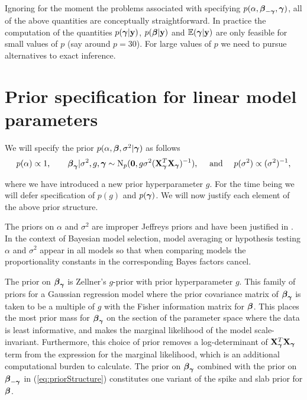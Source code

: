 Ignoring for the moment the problems associated with specifying
$p(\alpha,{\boldsymbol \beta}_{-{\boldsymbol \gamma}},{\boldsymbol \gamma})$, all of the above quantities are
conceptually straightforward. In practice the computation of the quantities
$p({\boldsymbol \gamma}|{\bf y})$, $p({\boldsymbol \beta}|{\bf y})$ and ${\mathbb E}({\boldsymbol \gamma}|{\bf y})$ are only feasible for
small values of $p$ (say around $p=30$). For large values of $p$ we need to
pursue alternatives to exact inference.



\section{Prior specification for linear model parameters}
\label{sec:model}

We will specify the prior $p(\alpha,{\boldsymbol \beta},\sigma^2|{\boldsymbol \gamma})$ as follows
\begin{equation}
	\label{eq:priorStructure}
	\begin{array}{c}
		\displaystyle p(\alpha) \propto 1,  
		\qquad 
		{\boldsymbol\beta}_{\boldsymbol \gamma} | \sigma^2, g, {\boldsymbol \gamma} \sim \text{N}_p({\bf 0}, g \sigma^2 ({\bf X}_{\boldsymbol \gamma}^T {\bf X}_{\boldsymbol \gamma})^{-1}),
		\quad \text{ and }  \quad 
		\displaystyle p(\sigma^2) \propto (\sigma^2)^{-1},                      
	\end{array}
\end{equation} 

\noindent where we have introduced a new prior hyperparameter $g$.  For the
time being we will defer specification of $p(g)$ and $p({\boldsymbol \gamma})$.  We will now
justify each element of the above prior structure.

The priors on $\alpha$ and $\sigma^2$ are improper Jeffreys priors and have
been justified in \cite{Berger1998}. In the context of Bayesian model
selection, model averaging or hypothesis testing $\alpha$ and $\sigma^2$ appear
in all models so that when comparing models the proportionality constants in
the corresponding Bayes factors cancel.

The prior on ${\boldsymbol \beta}_{\boldsymbol \gamma}$ is Zellner's $g$-prior \citep[see for
example,][]{Zellner1986} with prior hyperparameter $g$. This family of priors
for a Gaussian regression model where the prior covariance matrix of
${\boldsymbol \beta}_{\boldsymbol \gamma}$ is taken to be a multiple of $g$ with the Fisher information
matrix for ${\boldsymbol \beta}$.  This places the most prior mass for ${\boldsymbol \beta}_{\boldsymbol \gamma}$ on
the section of the parameter space where the data is least informative, and
makes the marginal likelihood of the model scale-invariant. Furthermore, this
choice of prior removes a log-determinant of ${\bf X}_{\boldsymbol \gamma}^T{\bf X}_{\boldsymbol \gamma}$ term
from the expression for the marginal likelihood, which is an additional
computational burden to calculate.  The prior on ${\boldsymbol \beta}_{\boldsymbol \gamma}$ combined with
the prior on ${\boldsymbol \beta}_{-{\boldsymbol \gamma}}$ in (\ref{eq:priorStructure}) constitutes one
variant of the spike and slab prior for ${\boldsymbol \beta}$.

